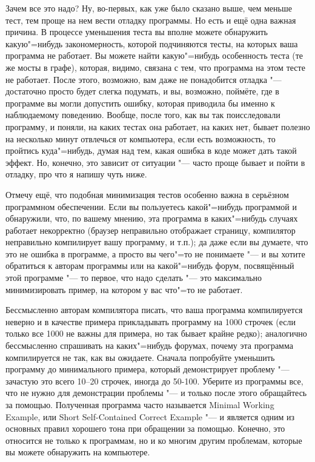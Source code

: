 \documentclass[a4paper,10pt]{problems}
\begin{document}
Зачем все это надо?
Ну, во-первых, как уже было сказано выше, чем меньше тест, тем проще на нем вести отладку программы.
Но есть и ещё одна важная причина. 
В процессе уменьшения теста вы вполне можете обнаружить какую"=нибудь закономерность, которой подчиняются тесты, на которых ваша программа не работает.
Вы можете найти какую"=нибудь особенность теста (те же мосты в графе), которая, видимо, связана с тем, что программа на этом тесте не работает.
После этого, возможно, вам даже не понадобится отладка "--- достаточно просто будет слегка подумать, и вы, возможно, поймёте, где в программе
вы могли допустить ошибку, которая приводила бы именно к наблюдаемому поведению.
Вообще, после того, как вы так поисследовали программу, и поняли, на каких тестах она работает, на каких нет, бывает полезно на несколько минут отвлечься
от компьютера, если есть возможность, то пройтись куда"=нибудь, думая над тем, какая ошибка в коде может дать такой эффект. 
Но, конечно, это зависит от ситуации "--- часто проще бывает и пойти в отладку, про что я напишу чуть ниже.

Отмечу ещё, что подобная минимизация тестов особенно важна в серьёзном программном обеспечении. 
Если вы пользуетесь какой"=нибудь программой и обнаружили, что, по вашему мнению, эта программа в каких"=нибудь случаях работает некорректно
(браузер неправильно отображает страницу, компилятор неправильно компилирует вашу программу, и т.п.); да даже если вы думаете, что это не ошибка в программе,
а просто вы чего"=то не понимаете "--- и вы хотите обратиться к авторам программы или на какой"=нибудь форум, посвящённый этой программе "--- 
то первое, что надо сделать "--- это максимально минимизировать пример, на котором у вас что"=то не работает.

Бессмысленно авторам компилятора писать, что ваша программа компилируется неверно и в качестве примера прикладывать программу на 1000 строчек 
(если только все 1000 не важны для примера, но так бывает крайне редко); 
аналогично бессмысленно спрашивать на каких"=нибудь форумах, почему эта программа компилируется не так, как вы ожидаете. 
Сначала попробуйте уменьшить программу до минимального примера, который демонстрирует проблему "--- зачастую это всего 10--20 строчек, иногда
до 50-100. 
Уберите из программы все, что не нужно для демонстрации проблемы "--- и только после этого обращайтесь за помощью. 
Полученная программа часто называется Minimal Working Example, или Short Self-Contained Correct Example "--- и является одним из
основных правил хорошего тона при обращении за помощью.
Конечно, это относится не только к программам, но и ко многим другим проблемам, которые вы можете обнаружить на компьютере.
\end{document}
